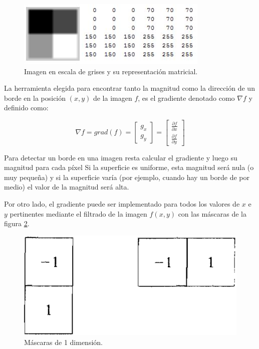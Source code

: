 \begin{figure}[hbt]
\begin{center}
\includegraphics[scale=0.8]{img/02_escala_grises.jpg}
\end{center}
\caption{Imagen en escala de grises y su representación matricial.}
\label{gonz2}
\end{figure}

La herramienta elegida para encontrar tanto la magnitud como la dirección de un borde en la posición $(x,y)$ de la imagen $f$, es el gradiente denotado como ${\nabla}f$ y definido como:

 \begin{equation}
{\nabla}f = grad(f) = \begin{bmatrix}
            {g_x} \\[0.3em]
            {g_y}
            \end{bmatrix} = \begin{bmatrix}
                    {\frac{{\partial}f}{{\partial}x}} \\[0.3em]
                    {\frac{{\partial}f}{{\partial}y}}
                      \end{bmatrix}
 \end{equation}

Para detectar un borde en una imagen resta calcular el gradiente y luego su magnitud para cada píxel Si la superficie es uniforme, esta magnitud será nula (o muy pequeña) y si la superficie varía (por ejemplo, cuando hay un borde de por medio) el valor de la magnitud será alta.

Por otro lado, el gradiente puede ser implementado para todos los valores de $x$ e $y$ pertinentes mediante el filtrado de la imagen $f(x,y)$ con las máscaras de la figura \ref{matrix1d}.

\begin{figure}[H]
\begin{center}
\includegraphics[scale=0.3]{img/matriz1d.png}
\end{center}
\caption{Máscaras de 1 dimensión.}
\label{matrix1d}
\end{figure}

